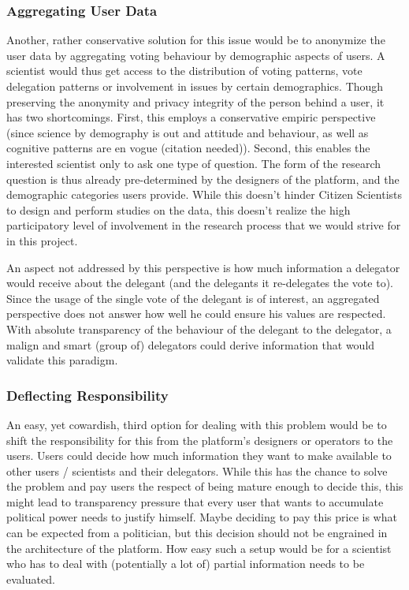 \subsubsection{Aggregating User Data}

Another, rather conservative solution for this issue would be to anonymize the user data by aggregating voting behaviour by demographic aspects of users. A scientist would thus get access to the distribution of voting patterns, vote delegation patterns or involvement in issues by certain demographics. Though preserving the anonymity and privacy integrity of the person behind a user, it has two shortcomings. First, this employs a conservative empiric perspective (since science by demography is out and attitude and behaviour, as well as cognitive patterns are en vogue (citation needed)). Second, this enables the interested scientist only to ask one type of question. The form of the research question is thus already pre-determined by the designers of the platform, and the demographic categories users provide. While this doesn't hinder Citizen Scientists to design and perform studies on the data, this doesn't realize the high participatory level of involvement in the research process that we would strive for in this project.

An aspect not addressed by this perspective is how much information a delegator would receive about the delegant (and the delegants it re-delegates the vote to). Since the usage of the single vote of the delegant is of interest, an aggregated perspective does not answer how well he could ensure his values are respected. With absolute transparency of the behaviour of the delegant to the delegator, a malign and smart (group of) delegators could derive information that would validate this paradigm.

\subsubsection{Deflecting Responsibility}

An easy, yet cowardish, third option for dealing with this problem would be to shift the responsibility for this from the platform's designers or operators to the users. Users could decide how much information they want to make available to other users / scientists and their delegators. While this has the chance to solve the problem and pay users the respect of being mature enough to decide this, this might lead to transparency pressure that every user that wants to accumulate political power needs to justify himself. Maybe deciding to pay this price is what can be expected from a politician, but this decision should not be engrained in the architecture of the platform. How easy such a setup would be for a scientist who has to deal with (potentially a lot of) partial information needs to be evaluated.

